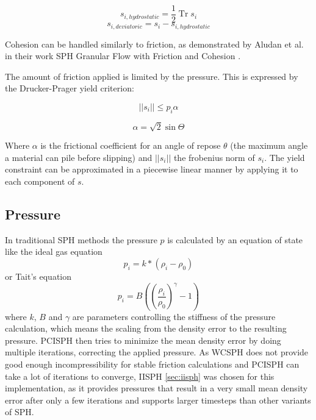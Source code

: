 \documentclass[intern]{cgMA}
\DeclareMathOperator{\Tr}{Tr}
\begin{document}
    \begin{equation}
        s_{i, hydrostatic} = \frac{1}{2} \Tr s_i 
    \end{equation}
    \begin{equation}
        s_{i, deviatoric} = s_i - s_{i, hydrostatic} 
    \end{equation}

    Cohesion can be handled similarly to friction, as demonstrated by Aludan et al. in their work SPH Granular Flow with Friction and Cohesion \cite{10.1145/2019406.2019410}.

    The amount of friction applied is limited by the pressure. This is expressed by the Drucker-Prager yield criterion:

    \begin{equation}
        ||s_i|| \leq p_i \alpha
    \end{equation}

    \begin{equation}
        \alpha = \sqrt{2} \sin \Theta
    \end{equation}

    Where $\alpha$ is the frictional coefficient for an angle of repose $\theta$ (the maximum angle a material can pile before slipping) and $||s_i||$ the frobenius norm of $s_i$. The yield constraint can be approximated in a piecewise linear manner by applying it to each component of $s$. \cite{10.1145/2019406.2019410} \cite{10.2312:PE:vriphys:vriphys12:053-060} \cite{10.2312:LocalChapterEvents:CEIG:CEIG09:011-018} \cite{10.1145/1866158.1866195}

    \subsection{Pressure} \label{sec:pressure}
    In traditional SPH methods the pressure $p$ is calculated by an equation of state like the ideal gas equation \cite{wcsph}
    \begin{equation}
        p_i = k * (\rho_i - \rho_0)
    \end{equation}
    or Tait's equation \cite{wcsph}
    \begin{equation}
        p_i = B ((\frac{\rho_i}{\rho_0})^{\gamma} - 1)
    \end{equation}
    where $k$, $B$ and $\gamma$ are parameters controlling the stiffness of the pressure calculation, which means the scaling from the density error to the resulting pressure.
    PCISPH then tries to minimize the mean density error by doing multiple iterations, correcting the applied pressure. As WCSPH does not provide good enough incompressibility for stable friction calculations and PCISPH can take a lot of iterations to converge, IISPH \ref{sec:iisph} was chosen for this implementation, as it provides pressures that result in a very small mean density error after only a few iterations and supports larger timesteps than other variants of SPH.
\end{document}
